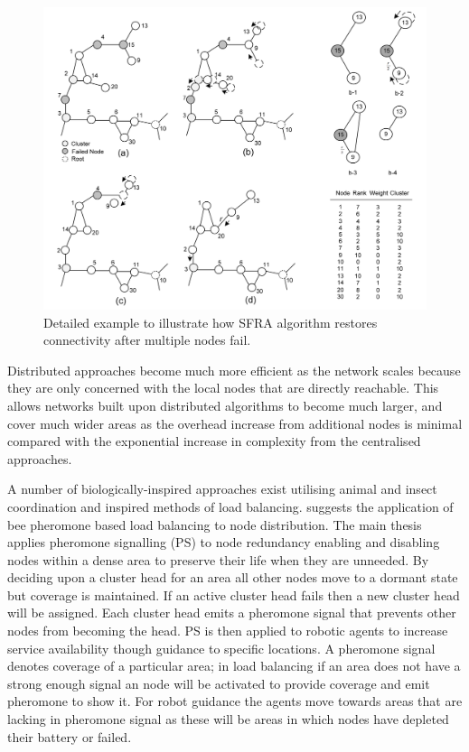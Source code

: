 \documentclass[authoryearcitations]{UoYCSproject}
\begin{document}
\begin{figure}
 \centering
    \includegraphics[width=\textwidth]{figures/sfra.png}
    \caption{Detailed example to illustrate how SFRA algorithm restores connectivity after multiple nodes fail.}
    \label{fig:sfra}
\end{figure}

Distributed approaches become much more efficient as the network scales because they are only concerned with the local nodes that are directly reachable. This allows networks built upon distributed algorithms to become much larger, and cover much wider areas as the overhead increase from additional nodes is minimal compared with the exponential increase in complexity from the centralised approaches.

A number of biologically-inspired approaches exist utilising animal and insect coordination and inspired methods of load balancing. \citet{Caliskanelli2014} suggests the application of bee pheromone based load balancing to node distribution. The main thesis applies pheromone signalling (PS) to node redundancy enabling and disabling nodes within a dense area to preserve their life when they are unneeded. By deciding upon a cluster head for an area all other nodes move to a dormant state but coverage is maintained. If an active cluster head fails then a new cluster head will be assigned. Each cluster head emits a pheromone signal that prevents other nodes from becoming the head. PS is then applied to robotic agents to increase service availability though guidance to specific locations. A pheromone signal denotes coverage of a particular area; in load balancing if an area does not have a strong enough signal an node will be activated to provide coverage and emit pheromone to show it. For robot guidance the agents move towards areas that are lacking in pheromone signal as these will be areas in which nodes have depleted their battery or failed.
\end{document}

